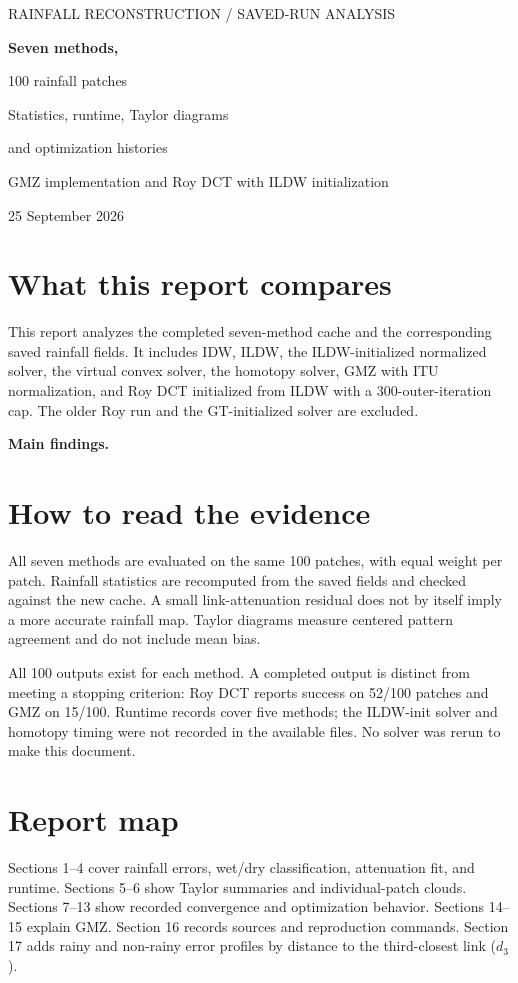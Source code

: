 \documentclass[11pt,a4paper]{article}
\begin{document}
\thispagestyle{empty}
{\color{blue}\large RAINFALL RECONSTRUCTION / SAVED-RUN ANALYSIS}\par
\vspace{7mm}
{\Huge\bfseries Seven methods,\par 100 rainfall patches}\par
\vspace{3mm}
{\Large Statistics, runtime, Taylor diagrams\par and optimization histories}\par
\vspace{4mm}
{\large GMZ implementation and Roy DCT with ILDW initialization}\par
\vspace{3mm}
25 September 2026

\section*{What this report compares}
This report analyzes the completed seven-method cache and the corresponding saved rainfall fields. It includes IDW, ILDW, the ILDW-initialized normalized solver, the virtual convex solver, the homotopy solver, GMZ with ITU normalization, and Roy DCT initialized from ILDW with a 300-outer-iteration cap. The older Roy run and the GT-initialized solver are excluded.

\colorbox{pale}{\parbox{.96\linewidth}{\textbf{Main findings.} \mainFindings}}

\section*{How to read the evidence}
All seven methods are evaluated on the same 100 patches, with equal weight per patch. Rainfall statistics are recomputed from the saved fields and checked against the new cache. A small link-attenuation residual does not by itself imply a more accurate rainfall map. Taylor diagrams measure centered pattern agreement and do not include mean bias.

All 100 outputs exist for each method. A completed output is distinct from meeting a stopping criterion: Roy DCT reports success on 52/100 patches and GMZ on 15/100. Runtime records cover five methods; the ILDW-init solver and homotopy timing were not recorded in the available files. No solver was rerun to make this document.

\section*{Report map}
Sections 1--4 cover rainfall errors, wet/dry classification, attenuation fit, and runtime. Sections 5--6 show Taylor summaries and individual-patch clouds. Sections 7--13 show recorded convergence and optimization behavior. Sections 14--15 explain GMZ. Section 16 records sources and reproduction commands. Section 17 adds rainy and non-rainy error profiles by distance to the third-closest link ($d_3$).
\end{document}
